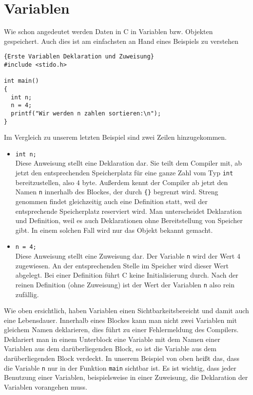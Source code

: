 \section{Variablen}

Wie schon angedeutet werden Daten in C in Variablen bzw. Objekten gespeichert.
Auch dies ist am einfachsten an Hand eines Beispiels zu verstehen
\begin{lstlisting}{Erste Variablen Deklaration und Zuweisung}
#include <stido.h>

int main()
{
  int n;
  n = 4;
  printf("Wir werden n zahlen sortieren:\n");
}
\end{lstlisting}
Im Vergleich zu unserem letzten Beispiel sind zwei Zeilen hinzugekommen. 
\begin{itemize}
\item \texttt{int n;}\\
  Diese Anweisung stellt eine Deklaration dar. 
  Sie teilt dem Compiler mit, ab jetzt den entsprechenden Speicherplatz für eine ganze Zahl vom Typ \texttt{int} bereitzustellen, also $4$ byte.
  Außerdem kennt der Compiler ab jetzt den Namen \texttt{n} innerhalb des Blockes, der durch \texttt{\{\}} begrenzt wird.
  Streng genommen findet gleichzeitig auch eine Definition statt, weil der entsprechende Speicherplatz reserviert wird. 
  Man unterscheidet Deklaration und Definition, weil es auch Deklarationen ohne Bereitstellung von Speicher gibt.
  In einem solchen Fall wird nur das Objekt bekannt gemacht.

\item \verb|n = 4;|\\
  Diese Anweisung stellt eine Zuweisung dar.
  Der Variable \texttt{n} wird der Wert $4$ zugewiesen.
  An der entsprechenden Stelle im Speicher wird dieser Wert abgelegt.
  Bei einer Definition führt C keine Initialisierung durch.
  Nach der reinen Definition (ohne Zuweisung) ist der Wert der Variablen \texttt{n} also rein zufällig.
\end{itemize}
Wie oben ersichtlich, haben Variablen einen Sichtbarkeitsbereicht und damit auch eine Lebensdauer.
Innerhalb eines Blockes kann man nicht zwei Variablen mit gleichem Namen deklarieren, dies führt zu einer Fehlermeldung des Compilers.
Deklariert man in einem Unterblock eine Variable mit dem Namen einer Variablen aus dem darüberliegenden Block, so ist die Variable aus dem darüberliegenden Block verdeckt.
In unserem Beispiel von oben heißt das, dass die Variable \texttt{n} nur in der Funktion \texttt{main} sichtbar ist. 
Es ist wichtig, dass jeder Benutzung einer Variablen, beispielsweise in einer Zuweisung, die Deklaration der Variablen vorangehen muss.
